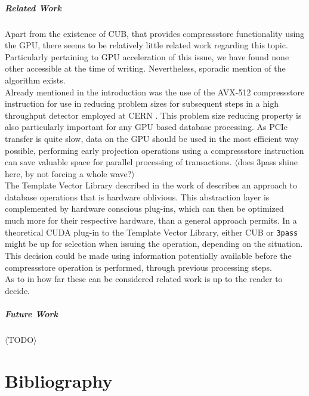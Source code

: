 \documentclass{tudscrreprt}
\newcommand{\markr}[1]{\textcolor{review}{$\langle$#1$\rangle$}}
\begin{document}
		\paragraph{Related Work} Apart from the existence of CUB, that provides compressstore functionality using the GPU, there seems to be relatively little related work regarding this topic. Particularly pertaining to GPU acceleration of this issue, we have found none other accessible at the time of writing. Nevertheless, sporadic mention of the algorithm exists. \\
		Already mentioned in the introduction was the use of the AVX-512 compressstore instruction for use in reducing problem sizes for subsequent steps in a high throughput detector employed at CERN \cite{cern_datastreaming}. This problem size reducing property is also particularly important for any GPU based database processing. As PCIe transfer is quite slow, data on the GPU should be used in the most efficient way possible, performing early projection operations using a compressstore instruction can save valuable space for parallel processing of transactions. \markr{does 3pass shine here, by not forcing a whole wave?}\\
		The Template Vector Library described in the work of \citeauthor{tvl} \cite{tvl} describes an approach to database operations that is hardware oblivious. This abstraction layer is complemented by hardware conscious plug-ins, which can then be optimized much more for their respective hardware, than a general approach permits. In a theoretical CUDA plug-in to the Template Vector Library, either CUB or \texttt{3pass} might be up for selection when issuing the operation, depending on the situation. This decision could be made using information potentially available before the compressstore operation is performed, through previous processing steps. \\
		As to in how far these can be considered related work is up to the reader to decide. \\

		\paragraph{Future Work} \markr{TODO}\\
		
	\chapter*{Bibliography}
		\printbibliography[heading=none]
	
\end{document}
